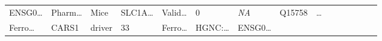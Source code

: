 \documentclass[
]{article}
\begin{document}
\begin{longtable}[]{@{}lllllllllllllll@{}}
\begin{minipage}[t]{0.05\columnwidth}
ENSG0\ldots{}\strut
\end{minipage} & \begin{minipage}[t]{0.05\columnwidth}\raggedright
Pharm\ldots{}\strut
\end{minipage} & \begin{minipage}[t]{0.05\columnwidth}\raggedright
Mice\strut
\end{minipage} & \begin{minipage}[t]{0.05\columnwidth}\raggedright
SLC1A\ldots{}\strut
\end{minipage} & \begin{minipage}[t]{0.05\columnwidth}\raggedright
Valid\ldots{}\strut
\end{minipage} & \begin{minipage}[t]{0.05\columnwidth}\raggedright
0\strut
\end{minipage} & \begin{minipage}[t]{0.05\columnwidth}\raggedright
\emph{NA}\strut
\end{minipage} & \begin{minipage}[t]{0.05\columnwidth}\raggedright
Q15758\strut
\end{minipage} & \begin{minipage}[t]{0.02\columnwidth}\raggedright
\ldots{}\strut
\end{minipage}\tabularnewline
\begin{minipage}[t]{0.05\columnwidth}\raggedright
Ferro\ldots{}\strut
\end{minipage} & \begin{minipage}[t]{0.05\columnwidth}\raggedright
CARS1\strut
\end{minipage} & \begin{minipage}[t]{0.04\columnwidth}\raggedright
driver\strut
\end{minipage} & \begin{minipage}[t]{0.02\columnwidth}\raggedright
33\strut
\end{minipage} & \begin{minipage}[t]{0.05\columnwidth}\raggedright
Ferro\ldots{}\strut
\end{minipage} & \begin{minipage}[t]{0.05\columnwidth}\raggedright
HGNC:\ldots{}\strut
\end{minipage} & \begin{minipage}[t]{0.05\columnwidth}\raggedright
ENSG0\ldots{}\strut
\end{minipage} & \begin{minipage}[t]{0.05\columnwidth}\raggedright

\end{minipage}
\end{longtable}
\end{document}
